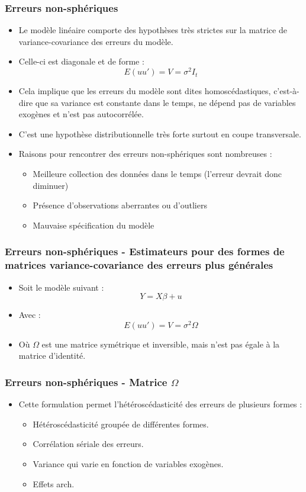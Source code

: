 \documentclass{beamer}
\begin{document}
\begin{frame}
\frametitle{Erreurs non-sphériques}
\begin{itemize}
    \item Le modèle linéaire comporte des hypothèses très strictes sur la matrice de variance-covariance des erreurs du modèle.
    \item Celle-ci est diagonale et de forme :
    \[
    E(uu') = V = \sigma^2 I_t
    \]
    \item Cela implique que les erreurs du modèle sont dites homoscédastiques, c’est-à-dire que sa variance est constante dans le temps, ne dépend pas de variables exogènes et n’est pas autocorrélée.
    \item C’est une hypothèse distributionnelle très forte surtout en coupe transversale.
    \item Raisons pour rencontrer des erreurs non-sphériques sont nombreuses :
    \begin{itemize}
        \item Meilleure collection des données dans le temps (l'erreur devrait donc diminuer)
        \item Présence d'observations aberrantes ou d'outliers
        \item Mauvaise spécification du modèle
    \end{itemize}
\end{itemize}
\end{frame}


\begin{frame}
\frametitle{Erreurs non-sphériques - Estimateurs pour des formes de matrices variance-covariance des erreurs plus générales}
\begin{itemize}
    \item Soit le modèle suivant :
    \[
    Y = X \beta + u
    \]
    \item Avec :
    \[
    E(uu') = V = \sigma^2 \Omega
    \]
    \item Où \( \Omega \) est une matrice symétrique et inversible, mais n’est pas égale à la matrice d’identité.
\end{itemize}
\end{frame}


\begin{frame}
\frametitle{Erreurs non-sphériques - Matrice \( \Omega \)}
\begin{itemize}
    \item Cette formulation permet l’hétéroscédasticité des erreurs de plusieurs formes :
    \begin{itemize}
        \item Hétéroscédasticité groupée de différentes formes.
        \item Corrélation sériale des erreurs.
        \item Variance qui varie en fonction de variables exogènes.
        \item Effets arch.
    \end{itemize}
\end{itemize}
\end{frame}
\end{document}

